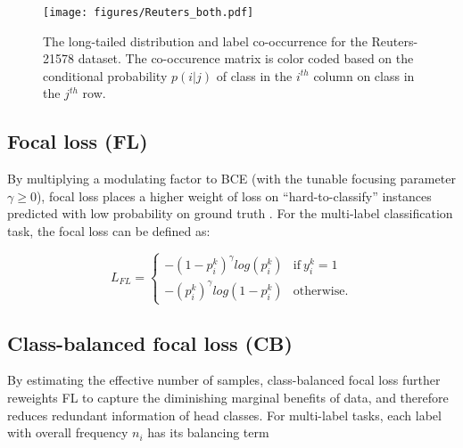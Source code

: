 \documentclass[11pt]{article}
\begin{document}
\begin{figure}[t]\centering
    \texttt{[image: figures/Reuters\_both.pdf]}
    \caption{The long-tailed distribution and label co-occurrence for the Reuters-21578 dataset. 
The co-occurence matrix is color coded based on the conditional probability $p(i|j)$ of class in the $i^{th}$ column on class in the $j^{th}$ row.}\label{fig:longtailed}\end{figure}

\begin{comment}

\small
\begin{equation}
\end{equation}
\normalsize

\end{comment}


\subsection{Focal loss (FL)}
By multiplying a modulating factor to BCE (with the tunable focusing parameter $\gamma\ge 0$), focal loss places a higher weight of loss on “hard-to-classify” instances predicted with low probability on ground truth \citep{lin2017focal}.
For the multi-label classification task, the focal loss can be defined as:


\small
  \begin{equation}
    L_{FL}=
    \begin{cases}
      -(1-p_{i}^{k})^{\gamma}log(p_{i}^{k}) & \text{if}\ y_{i}^{k}=1 \\
      -{(p_{i}^{k})}^{\gamma}log(1-p_{i}^{k}) & \text{otherwise.}
    \end{cases}
  \end{equation}
\normalsize

\begin{comment}
\small
\begin{equation}
L_{FL} = -[y_{i}^{k}(1-p_{i}^{k})^{\gamma}log(p_{i}^{k})+(1-y_{i}^{k}) {(p_{i}^{k})}^{\gamma}log(1-p_{i}^{k}) ]
\end{equation}
\normalsize
\end{comment}

\subsection{Class-balanced focal loss (CB)}
By estimating the effective number of samples, class-balanced focal loss \citep{class-balanced-loss} further reweights FL to capture the diminishing marginal benefits of data, and therefore reduces redundant information of head classes.
For multi-label tasks, each label with overall frequency $n_{i}$ has its balancing term
\end{document}
